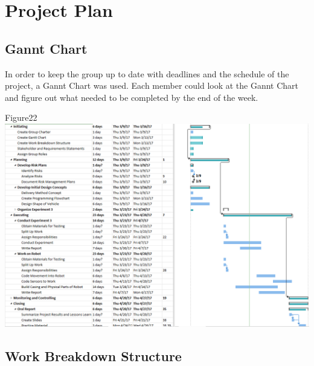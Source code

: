 \documentclass{article}
\begin{document}
\section{Project Plan}
\subsection{Gannt Chart}
In order to keep the group up to date with deadlines and the schedule of the project, a Gannt Chart was used. Each member could look at the Gannt Chart and figure out what needed to be completed by the end of the week.
\begin{center}{Figure22 \includegraphics[width=\textwidth]{GanttChart.png}}\end{center}

\subsection{Work Breakdown Structure}
\end{document}
